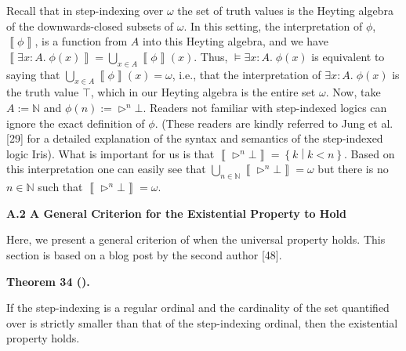 \documentclass[10pt,a4paper]{article}
\begin{document}
Recall that in step-indexing over $\omega$ the set of truth values is the Heyting algebra of the downwards-closed subsets of $\omega$. In this setting, the interpretation of $\phi$, $\left\llbracket\phi\right\rrbracket$, is a function from $A$ into this Heyting algebra, and we have $\left\llbracket\exists x:A.\;\phi(x)\right\rrbracket=\bigcup_{x\in A}\left\llbracket\phi\right\rrbracket(x)$. Thus, $\models\exists x:A.\;\phi(x)$ is equivalent to saying that $\bigcup_{x\in A}\left\llbracket\phi\right\rrbracket(x)=\omega$, i.e., that the interpretation of $\exists x:A.\;\phi(x)$ is the truth value $\top$, which in our Heyting algebra is the entire set $\omega$. Now, take $A:=\mathbb{N}$ and $\phi(n):=\rhd^{n}\bot$. Readers not familiar with step-indexed logics can ignore the exact definition of $\phi$. (These readers are kindly referred to Jung et al. [29] for a detailed explanation of the syntax and semantics of the step-indexed logic Iris). What is important for us is that $\left\llbracket\rhd^{n}\bot\right\rrbracket=\left\{k\middle|k<n\right\}$. Based on this interpretation one can easily see that $\bigcup_{n\in\mathbb{N}}\left\llbracket\rhd^{n}\bot\right\rrbracket=\omega$ but there is no $n\in\mathbb{N}$ such that $\left\llbracket\rhd^{n}\bot\right\rrbracket=\omega$.\par
 
 
 
 
\par\medskip\noindent\textbf{A.2 A General Criterion for the Existential Property to Hold}\par
 
 
Here, we present a general criterion of when the universal property holds. This section is based on a blog post by the second author [48].\par
 
 
 
\par\medskip\noindent\textbf{Theorem 34 ().}\par
 
 
If the step-indexing is a regular ordinal and the cardinality of the set quantified over is strictly smaller than that of the step-indexing ordinal, then the existential property holds.\par
 
\end{document}
